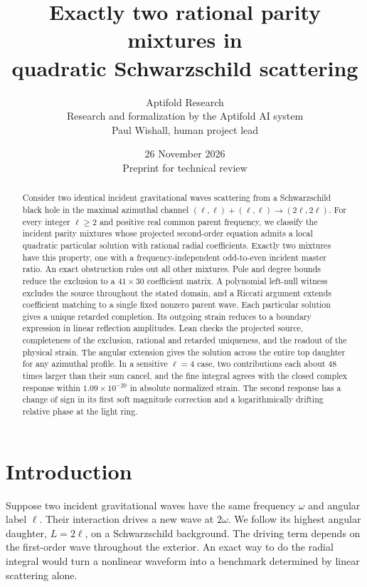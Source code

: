 \documentclass[11pt]{article}
\title{Exactly two rational parity mixtures in\\quadratic Schwarzschild scattering}
\author{Aptifold Research\\[0.4em]
\small Research and formalization by the Aptifold AI system\\
\small Paul Wishall, human project lead}
\date{26 November 2026 \\ \small Preprint for technical review}
\begin{document}
\maketitle

\begin{abstract}
Consider two identical incident gravitational waves scattering from a Schwarzschild black hole in the maximal azimuthal channel
\((\ell,\ell)+(\ell,\ell)\to(2\ell,2\ell)\).
For every integer \(\ell\geq2\) and positive real common parent frequency, we classify the incident parity mixtures whose projected second-order equation admits a local quadratic particular solution with rational radial coefficients.
Exactly two mixtures have this property, one with a frequency-independent odd-to-even incident master ratio.
An exact obstruction rules out all other mixtures.
Pole and degree bounds reduce the exclusion to a \(41\times 30\) coefficient matrix.
A polynomial left-null witness excludes the source throughout the stated domain, and a Riccati argument extends coefficient matching to a single fixed nonzero parent wave.
Each particular solution gives a unique retarded completion. Its outgoing strain reduces to a boundary expression in linear reflection amplitudes.
Lean checks the projected source, completeness of the exclusion, rational and retarded uniqueness, and the readout of the physical strain.
The angular extension gives the solution across the entire top daughter for any azimuthal profile.
In a sensitive \(\ell=4\) case, two contributions each about \(48\) times larger than their sum cancel, and the fine integral agrees with the closed complex response within \(1.09\times10^{-20}\) in absolute normalized strain.
The second response has a change of sign in its first soft magnitude correction and a logarithmically drifting relative phase at the light ring.
\end{abstract}

\section{Introduction}

Suppose two incident gravitational waves have the same frequency \(\omega\) and angular label \(\ell\). Their interaction drives a new wave at \(2\omega\). We follow its highest angular daughter, \(L=2\ell\), on a Schwarzschild background.
The driving term depends on the first-order wave throughout the exterior.
An exact way to do the radial integral would turn a nonlinear waveform into a benchmark determined by linear scattering alone.
\end{document}

